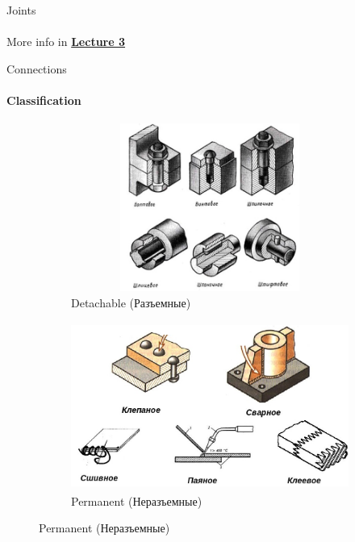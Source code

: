 \documentclass[aspectratio=169]{beamer}
\begin{document}
\begin{frame}[c]{Joints}
\framesubtitle{}
    \centering \LARGE More info in \textbf{\href{https://github.com/Lupasic/MaM_Inno_2023/blob/main/lectures/3/MaM_lec3.pdf}{Lecture 3}}
\end{frame}

\begin{frame}[t]{Connections}
\framesubtitle{Classification}
    \vspace{-0.7cm}
    \begin{figure}[H]
        \begin{subfigure}{0.48\textwidth}
            \centering\includegraphics[height=5.5cm,width=1\textwidth,keepaspectratio]{detach.jpg}
            \caption*{Detachable (Разъемные)}
            \label{fig:detach.jpg}
        \end{subfigure}
        \begin{subfigure}{0.48\textwidth}
            \centering\includegraphics[height=5.5cm,width=1\textwidth,keepaspectratio]{fixed.jpg}
            \caption*{Permanent (Неразъемные)}
            \label{fig:fixed.jpg}
        \end{subfigure}
    \end{figure}
\end{frame}
\end{document}
